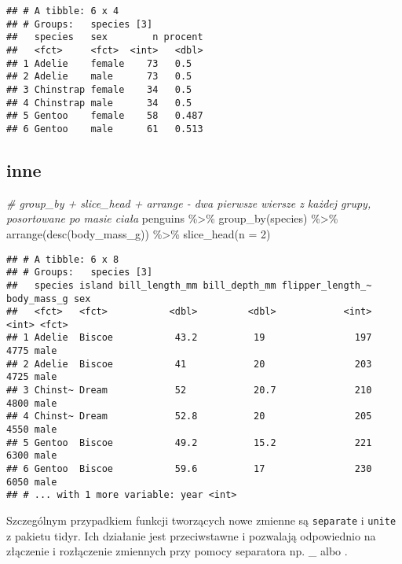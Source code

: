 \documentclass[
]{book}
\newenvironment{Shaded}{\begin{snugshade}}{\end{snugshade}}
\newcommand{\AttributeTok}[1]{\textcolor[rgb]{0.77,0.63,0.00}{#1}}
\newcommand{\CommentTok}[1]{\textcolor[rgb]{0.56,0.35,0.01}{\textit{#1}}}
\newcommand{\DecValTok}[1]{\textcolor[rgb]{0.00,0.00,0.81}{#1}}
\newcommand{\FunctionTok}[1]{\textcolor[rgb]{0.00,0.00,0.00}{#1}}
\newcommand{\NormalTok}[1]{#1}
\newcommand{\SpecialCharTok}[1]{\textcolor[rgb]{0.00,0.00,0.00}{#1}}
\begin{document}
\begin{verbatim}
## # A tibble: 6 x 4
## # Groups:   species [3]
##   species   sex        n procent
##   <fct>     <fct>  <int>   <dbl>
## 1 Adelie    female    73   0.5  
## 2 Adelie    male      73   0.5  
## 3 Chinstrap female    34   0.5  
## 4 Chinstrap male      34   0.5  
## 5 Gentoo    female    58   0.487
## 6 Gentoo    male      61   0.513
\end{verbatim}

\hypertarget{inne}{%
\subsection{inne}\label{inne}}

\begin{Shaded}
\begin{Highlighting}[]
\CommentTok{\# group\_by + slice\_head + arrange {-} dwa pierwsze wiersze z każdej grupy, posortowane po masie ciała}
\NormalTok{penguins }\SpecialCharTok{\%\textgreater{}\%} \FunctionTok{group\_by}\NormalTok{(species) }\SpecialCharTok{\%\textgreater{}\%} \FunctionTok{arrange}\NormalTok{(}\FunctionTok{desc}\NormalTok{(body\_mass\_g)) }\SpecialCharTok{\%\textgreater{}\%} \FunctionTok{slice\_head}\NormalTok{(}\AttributeTok{n =} \DecValTok{2}\NormalTok{)}
\end{Highlighting}
\end{Shaded}

\begin{verbatim}
## # A tibble: 6 x 8
## # Groups:   species [3]
##   species island bill_length_mm bill_depth_mm flipper_length_~ body_mass_g sex  
##   <fct>   <fct>           <dbl>         <dbl>            <int>       <int> <fct>
## 1 Adelie  Biscoe           43.2          19                197        4775 male 
## 2 Adelie  Biscoe           41            20                203        4725 male 
## 3 Chinst~ Dream            52            20.7              210        4800 male 
## 4 Chinst~ Dream            52.8          20                205        4550 male 
## 5 Gentoo  Biscoe           49.2          15.2              221        6300 male 
## 6 Gentoo  Biscoe           59.6          17                230        6050 male 
## # ... with 1 more variable: year <int>
\end{verbatim}

Szczególnym przypadkiem funkcji tworzących nowe zmienne są \texttt{separate} i \texttt{unite} z pakietu tidyr. Ich działanie jest przeciwstawne i pozwalają odpowiednio na złączenie i rozłączenie zmiennych przy pomocy separatora np. \_ albo .
\end{document}
